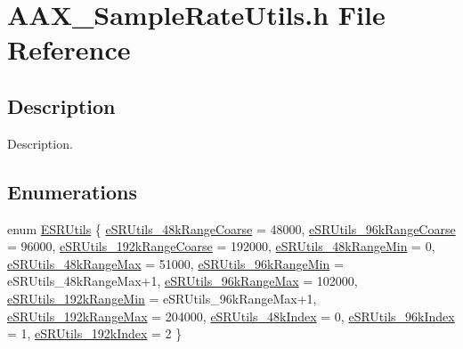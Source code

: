 \hypertarget{a00782}{}\section{A\+A\+X\+\_\+\+Sample\+Rate\+Utils.\+h File Reference}
\label{a00782}


\subsection{Description}
Description. 

\subsection*{Enumerations}
\begin{DoxyCompactItemize}
\item 
enum \mbox{\hyperlink{a00782_a65f189058b3204334c2c13d368d8ce3e}{E\+S\+R\+Utils}} \{ \newline
\mbox{\hyperlink{a00782_a65f189058b3204334c2c13d368d8ce3eae974abf255ac5507a0c8163d0ebf9bcb}{e\+S\+R\+Utils\+\_\+48k\+Range\+Coarse}} = 48000, 
\mbox{\hyperlink{a00782_a65f189058b3204334c2c13d368d8ce3ea376e9c46e970aa93e789445670b1d45f}{e\+S\+R\+Utils\+\_\+96k\+Range\+Coarse}} = 96000, 
\mbox{\hyperlink{a00782_a65f189058b3204334c2c13d368d8ce3eadc3653ea09f8a83c8222afc5a386e28f}{e\+S\+R\+Utils\+\_\+192k\+Range\+Coarse}} = 192000, 
\mbox{\hyperlink{a00782_a65f189058b3204334c2c13d368d8ce3eaec0fdd5b4e84f205ff16852740f18ea2}{e\+S\+R\+Utils\+\_\+48k\+Range\+Min}} = 0, 
\newline
\mbox{\hyperlink{a00782_a65f189058b3204334c2c13d368d8ce3ea1676c77c5473c1f0b7e820150869d413}{e\+S\+R\+Utils\+\_\+48k\+Range\+Max}} = 51000, 
\mbox{\hyperlink{a00782_a65f189058b3204334c2c13d368d8ce3ea858679d6660025243d5e9b0f06797f7f}{e\+S\+R\+Utils\+\_\+96k\+Range\+Min}} = e\+S\+R\+Utils\+\_\+48k\+Range\+Max+1, 
\mbox{\hyperlink{a00782_a65f189058b3204334c2c13d368d8ce3eabc1086d9707a35f99ed52f59b6b14934}{e\+S\+R\+Utils\+\_\+96k\+Range\+Max}} = 102000, 
\mbox{\hyperlink{a00782_a65f189058b3204334c2c13d368d8ce3ea675774f7e038af726de7561dcd3f314b}{e\+S\+R\+Utils\+\_\+192k\+Range\+Min}} = e\+S\+R\+Utils\+\_\+96k\+Range\+Max+1, 
\newline
\mbox{\hyperlink{a00782_a65f189058b3204334c2c13d368d8ce3eaac7e670dc4a1cc396be2fd024f6a237f}{e\+S\+R\+Utils\+\_\+192k\+Range\+Max}} = 204000, 
\mbox{\hyperlink{a00782_a65f189058b3204334c2c13d368d8ce3eaa501e86b22b5be0d003d73ad5fd4e1f5}{e\+S\+R\+Utils\+\_\+48k\+Index}} = 0, 
\mbox{\hyperlink{a00782_a65f189058b3204334c2c13d368d8ce3ea0cb96ccca8f89676f461df0054ee2678}{e\+S\+R\+Utils\+\_\+96k\+Index}} = 1, 
\mbox{\hyperlink{a00782_a65f189058b3204334c2c13d368d8ce3eafdb7fb04ad5032eeccbeec8d26a4a04c}{e\+S\+R\+Utils\+\_\+192k\+Index}} = 2
 \}
\end{DoxyCompactItemize}
